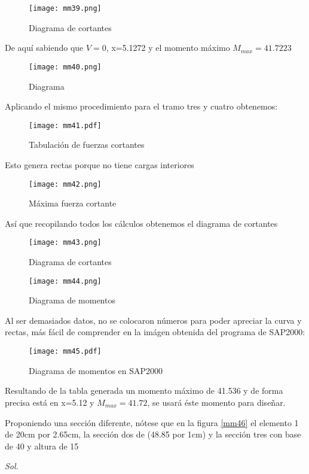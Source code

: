 \begin{figure}[h!]
\centering
  \texttt{[image: mm39.png]}
  \caption{Diagrama de cortantes}
  \label{mm39}
\end{figure}
De aquí sabiendo que $V=0$, x=5.1272 y el momento máximo $M_{max}=41.7223$
\begin{figure}[h!]
\centering
  \texttt{[image: mm40.png]}
  \caption{Diagrama}
  \label{mm40}
\end{figure}
Aplicando el mismo procedimiento para el tramo tres y cuatro obtenemos:
\begin{figure}[h!]
\centering
  \texttt{[image: mm41.pdf]}
  \caption{Tabulación de fuerzas cortantes}
  \label{mm41}
\end{figure}
Esto genera rectas porque no tiene cargas interiores
\begin{figure}[h!]
\centering
  \texttt{[image: mm42.png]}
  \caption{Máxima fuerza cortante}
  \label{mm42}
\end{figure}
Así que recopilando todos los cálculos obtenemos el diagrama de cortantes 
\begin{figure}[h!]
\centering
  \texttt{[image: mm43.png]}
  \caption{Diagrama de cortantes}
  \label{mm43}
\end{figure}
\begin{figure}[h!]
\centering
  \texttt{[image: mm44.png]}
  \caption{Diagrama de momentos}
  \label{mm44}
\end{figure}
Al ser demasiados datos, no se colocaron números para poder apreciar la curva y rectas, más fácil de comprender en la imágen obtenida del programa de SAP2000:
\begin{figure}[h!]
\centering
  \texttt{[image: mm45.pdf]}
  \caption{Diagrama de momentos en SAP2000}
  \label{mm45}
\end{figure}
Resultando de la tabla generada un momento máximo de 41.536 y de forma precisa está en x=5.12 y $M_{max}=41.72$, se usará éste momento para diseñar.

\begin{example}
    Proponiendo una sección diferente, nótese que en la figura \ref{mm46} el elemento 1 de 20cm por 2.65cm, la sección dos de (48.85 por 1cm) y la  sección tres con base de 40 y altura de 15
\end{example}

\textit{ Sol. }

